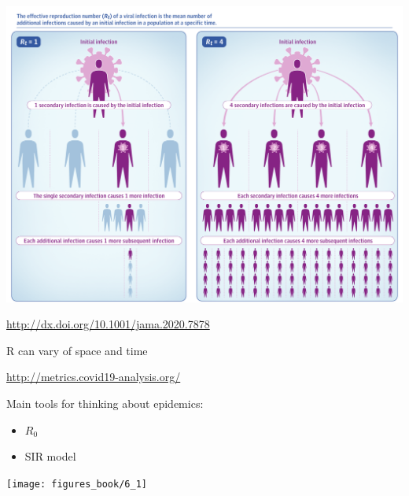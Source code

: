 \documentclass[aspectratio=169]{beamer}
\begin{document}
\begin{frame}

\begin{center}
\includegraphics[height = 0.90\textheight]{figures/inglesby_public_2020_fig1}
\end{center}

\vfill
\url{http://dx.doi.org/10.1001/jama.2020.7878}
\end{frame}
\begin{frame}

R can vary of space and time

\url{http://metrics.covid19-analysis.org/}

\end{frame}
\begin{frame}

Main tools for thinking about epidemics:
\begin{itemize}
\item $R_0$
\item SIR model
\end{itemize}

\note{
}

\end{frame}
\begin{frame}

\begin{center}
\texttt{[image: figures\_book/6\_1]}
\end{center}

\end{frame}
\end{document}
